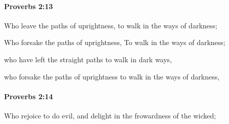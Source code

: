 		\paragraph{Proverbs 2:13} %
			\label{PROVERBS-2-13}

			Who leave the paths of uprightness, to walk in the ways of darkness;

			\begin{versebox}
					\item[BHS] 
					\item[ASV] Who forsake the paths of uprightness, To walk in the ways of darkness;
					\item[NIV] who have left the straight paths to walk in dark ways,
					\item[NRSV] who forsake the paths of uprightness to walk in the ways of darkness,
			\end{versebox}

		\paragraph{Proverbs 2:14} %
			\label{PROVERBS-2-14}

			Who rejoice to do evil, and delight in the frowardness of the wicked;

